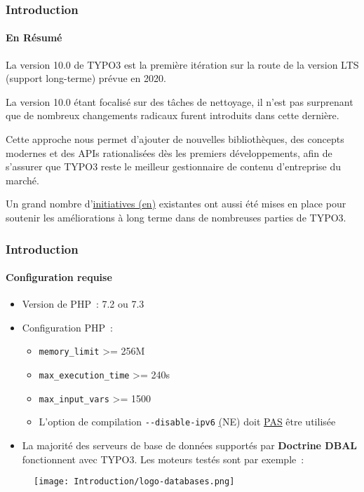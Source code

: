 \begin{frame}[fragile]
	\frametitle{Introduction}
	\framesubtitle{En Résumé}

	\small
		La version 10.0 de TYPO3 est la première itération sur la route de
		la version LTS (support long-terme) prévue en 2020.

		\vspace{0.2cm}

		La version 10.0 étant focalisé sur des tâches de nettoyage, il n'est pas
		surprenant que de nombreux changements radicaux furent introduits dans cette
		dernière.

		\vspace{0.2cm}

		Cette approche nous permet d'ajouter de nouvelles bibliothèques, des concepts
		modernes et des APIs rationalisées dès les premiers développements, afin de
		s'assurer que TYPO3 reste le meilleur gestionnaire de contenu d'entreprise du marché.

		\vspace{0.2cm}

		Un grand nombre
		d'\href{https://typo3.org/community/teams/typo3-development/initiatives/}{initiatives (en)}
		existantes ont aussi été mises en place pour soutenir les améliorations à long
		terme dans de nombreuses parties de TYPO3.
	\normalsize

\end{frame}


\begin{frame}[fragile]
	\frametitle{Introduction}
	\framesubtitle{Configuration requise}

	\begin{itemize}
		\item Version de PHP~: 7.2 ou 7.3
		\item Configuration PHP~:

			\begin{itemize}
				\item \texttt{memory\_limit} >= 256M
				\item \texttt{max\_execution\_time} >= 240s
				\item \texttt{max\_input\_vars} >= 1500
				\item L'option de compilation \texttt{-}\texttt{-disable-ipv6}
					\underline(NE) doit \underline{PAS} être utilisée
			\end{itemize}

		\item La majorité des serveurs de base de données supportés par \textbf{Doctrine DBAL}
			fonctionnent avec TYPO3. Les moteurs testés sont par exemple~:
	\end{itemize}

	\begin{figure}
		\texttt{[image: Introduction/logo-databases.png]}
	\end{figure}

\end{frame}

